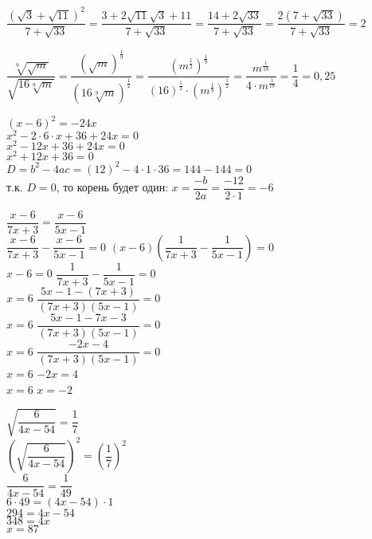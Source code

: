 \documentclass[10pt,]{article}
\begin{document}
\begin{listofex}
	\item \( \dfrac{(\sqrt{3}+\sqrt{11})^2}{7+\sqrt{33}}=\dfrac{3+2\sqrt{11}\sqrt{3}+11}{7+\sqrt{33}}=\dfrac{14+2\sqrt{33}}{7+\sqrt{33}}=\dfrac{2(7+\sqrt{33})}{7+\sqrt{33}}=2 \)
	\item \( \dfrac{\sqrt[9]{\sqrt{m}}}{\sqrt{16\sqrt[9]{m}}}=\dfrac{(\sqrt{m})^{\tfrac{1}{9}}}{(16\sqrt[9]{m})^{\tfrac{1}{2}}}=\dfrac{(m^{\tfrac{1}{2}})^{\tfrac{1}{9}}}{(16)^{\tfrac{1}{2}}\cdot(m^{\tfrac{1}{9}})^{\tfrac{1}{2}}}=\dfrac{m^{\tfrac{1}{18}}}{4\cdot m^{\tfrac{1}{18}}}=\dfrac{1}{4}=0,25 \)
	\newpage
	\item \( (x-6)^2=-24x \)\\
	\( x^2-2\cdot6\cdot x+36+24x=0 \)\\
	\( x^2-12x+36+24x=0 \)\\
	\( x^2+12x+36=0 \)\\
	\( D=b^2-4ac=(12)^2-4\cdot1\cdot36=144-144=0 \)\\
	т.к. \( D=0 \), то корень будет один:
	\( x=\dfrac{-b}{2a}=\dfrac{-12}{2\cdot1}=-6 \)
	\item \( \dfrac{x-6}{7x+3}=\dfrac{x-6}{5x-1} \)\\
	\( \dfrac{x-6}{7x+3}-\dfrac{x-6}{5x-1}=0 \)
	\( (x-6)\left( \dfrac{1}{7x+3}-\dfrac{1}{5x-1} \right) =0\)\\
	\( x-6=0 \) \quad \quad \quad \( \dfrac{1}{7x+3}-\dfrac{1}{5x-1}=0 \)\\
	\( x=6 \) \quad \quad \quad \( \dfrac{5x-1-(7x+3)}{(7x+3)(5x-1)}=0 \)\\
	\( x=6 \) \quad \quad \quad \( \dfrac{5x-1-7x-3}{(7x+3)(5x-1)}=0 \)\\
	\( x=6 \) \quad \quad \quad \( \dfrac{-2x-4}{(7x+3)(5x-1)}=0 \)\\
	\( x=6 \) \quad \quad \quad \( -2x=4 \)\\
	\( x=6 \) \quad \quad \quad \( x=-2 \)\\
	\item \( \sqrt{\dfrac{6}{4x-54}}=\dfrac{1}{7} \)\\
	\( \left( \sqrt{\dfrac{6}{4x-54}} \right)^2=\left( \dfrac{1}{7} \right)^2 \)\\
	\( \dfrac{6}{4x-54}=\dfrac{1}{49} \)\\
	\( 6\cdot49=(4x-54)\cdot1 \)\\
	\( 294=4x-54 \)\\
	\( 348=4x \)\\
	\( x=87 \)
\end{listofex}
\end{document}
